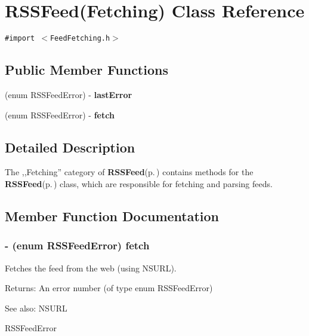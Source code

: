 \section{RSSFeed(Fetching) Class Reference}
\label{categoryRSSFeed(Fetching)}
{\tt \#import $<$Feed\-Fetching.h$>$}

\subsection*{Public Member Functions}
\begin{CompactItemize}
\item 
(enum RSSFeed\-Error) - {\bf last\-Error}
\item 
(enum RSSFeed\-Error) - {\bf fetch}
\end{CompactItemize}


\subsection{Detailed Description}
The ,,Fetching'' category of {\bf RSSFeed}{\rm (p.\,\pageref{interfaceRSSFeed})} contains methods for the {\bf RSSFeed}{\rm (p.\,\pageref{interfaceRSSFeed})} class, which are responsible for fetching and parsing feeds.



\subsection{Member Function Documentation}
\subsubsection{\setlength{\rightskip}{0pt plus 5cm}- (enum RSSFeed\-Error) fetch }\label{categoryRSSFeed(Fetching)_a2}


Fetches the feed from the web (using NSURL).

\begin{Desc}
\item[Returns:]An error number (of type enum RSSFeed\-Error) \end{Desc}
\begin{Desc}
\item[See also:]NSURL 

RSSFeed\-Error\end{Desc}
